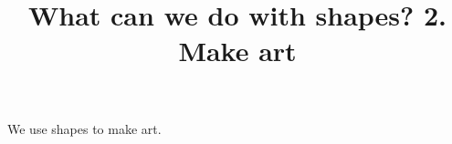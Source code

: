 \documentclass{ximera}
\title{What can we do with shapes? 2. Make art}
\begin{document}
\begin{abstract}
\end{abstract}
\maketitle

We use shapes to make art.
\end{document}
